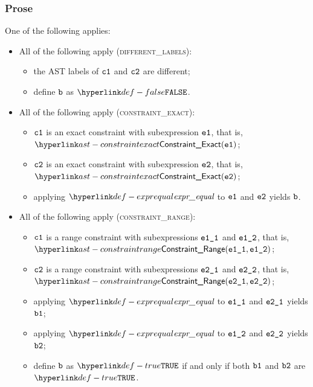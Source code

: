 \subsubsection{Prose}
One of the following applies:
\begin{itemize}
  \item All of the following apply (\textsc{different\_labels}):
  \begin{itemize}
    \item the AST labels of $\texttt{c1}$ and $\texttt{c2}$ are different;
    \item define $\texttt{b}$ as $\False$.
  \end{itemize}

  \item All of the following apply (\textsc{constraint\_exact}):
  \begin{itemize}
    \item $\texttt{c1}$ is an exact constraint with subexpression $\texttt{e1}$, that is, $\ConstraintExact(\veone)$;
    \item $\texttt{c2}$ is an exact constraint with subexpression $\texttt{e2}$, that is, $\ConstraintExact(\vetwo)$;
    \item applying $\exprequal$ to $\texttt{e1}$ and $\texttt{e2}$ yields $\texttt{b}$\ProseOrTypeError.
  \end{itemize}

  \item All of the following apply (\textsc{constraint\_range}):
  \begin{itemize}
    \item $\texttt{c1}$ is a range constraint with subexpressions $\texttt{e1\_1}$ and $\texttt{e1\_2}$, that is, \\ $\ConstraintRange(\veoneone, \veonetwo)$;
    \item $\texttt{c2}$ is a range constraint with subexpressions $\texttt{e2\_1}$ and $\texttt{e2\_2}$, that is, \\ $\ConstraintRange(\vetwoone, \vetwotwo)$;
    \item applying $\exprequal$ to $\texttt{e1\_1}$ and $\texttt{e2\_1}$ yields $\texttt{b1}$\ProseOrTypeError;
    \item applying $\exprequal$ to $\texttt{e1\_2}$ and $\texttt{e2\_2}$ yields $\texttt{b2}$\ProseOrTypeError;
    \item define $\texttt{b}$ as $\True$ if and only if both $\texttt{b1}$ and $\texttt{b2}$ are $\True$.
  \end{itemize}
\end{itemize}

